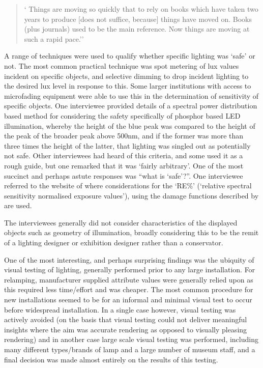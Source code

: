 \begin{quote}
`   Things are moving so quickly that to rely on books which have taken two years to produce [does not suffice, because] things have moved on. Books (plus journals) used to be the main reference. Now things are moving at such a rapid pace.''
\end{quote}

A range of techniques were used to qualify whether specific lighting was `safe' or not. The most common practical technique was spot metering of lux values incident on specific objects, and selective dimming to drop incident lighting to the desired lux level in response to this. Some larger institutions with access to microfading equipment were able to use this in the determination of sensitivity of specific objects. One interviewee provided details of a spectral power distribution based method for considering the safety specifically of phosphor based \gls{LED} illumination, whereby the height of the blue peak was compared to the height of the peak of the broader peak above 500nm, and if the former was more than three times the height of the latter, that lighting was singled out as potentially not safe. Other interviewees had heard of this criteria, and some used it as a rough guide, but one remarked that it was `fairly arbitrary'. One of the most succinct and perhaps astute responses was ``what is `safe'?''. One interviewee referred to the website of \citet{padfield_relative_2012} where considerations for the `RE\%' (`relative spectral sensitivity normalised exposure values'), using the damage functions described by \citet{aydinli_deterioration_1990} are used.

The interviewees generally did not consider characteristics of the displayed objects such as geometry of illumination, broadly considering this to be the remit of a lighting designer or exhibition designer rather than a conservator.

One of the most interesting, and perhaps surprising findings was the ubiquity of visual testing of lighting, generally performed prior to any large installation. For relamping, manufacturer supplied attribute values were generally relied upon as this required less time/effort and was cheaper. The most common procedure for new installations seemed to be for an informal and minimal visual test to occur before widespread installation. In a single case however, visual testing was actively avoided (on the basis that visual testing could not deliver meaningful insights where the aim was accurate rendering as opposed to visually pleasing rendering) and in another case large scale visual testing was performed, including many different types/brands of lamp and a large number of museum staff, and a final decision was made almost entirely on the results of this testing.

